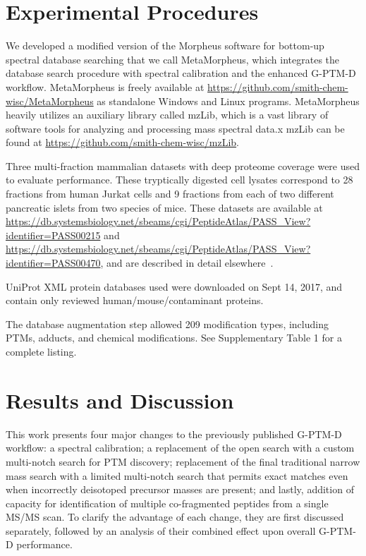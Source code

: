 \documentclass[journal=jprobs,manuscript=article]{achemso}
\begin{document}
\section{Experimental Procedures}

We developed a modified version of the Morpheus software for bottom-up spectral database searching\citep{Wenger_2013} that we call MetaMorpheus, which integrates the database search procedure with spectral calibration and the enhanced G-PTM-D workflow.
MetaMorpheus is freely available at \url{https://github.com/smith-chem-wisc/MetaMorpheus} as standalone Windows and Linux programs.
MetaMorpheus heavily utilizes an auxiliary library called mzLib, which is a vast library of software tools for analyzing and processing mass spectral data.x
mzLib can be found at \url{https://github.com/smith-chem-wisc/mzLib}.

Three multi-fraction mammalian datasets with deep proteome coverage were used to evaluate performance.
These tryptically digested cell lysates correspond to 28 fractions from human Jurkat cells and 9 fractions from each of two different pancreatic islets from two species of mice.
These datasets are available at \url{https://db.systemsbiology.net/sbeams/cgi/PeptideAtlas/PASS_View?identifier=PASS00215} and \url{https://db.systemsbiology.net/sbeams/cgi/PeptideAtlas/PASS_View?identifier=PASS00470}, and are described in detail elsewhere~\citep{Sheynkman2013, Shortreed_2015, Cesnik_2016}.

UniProt XML protein databases used were downloaded on Sept 14, 2017, and contain only reviewed human/mouse/contaminant proteins.

The database augmentation step allowed 209 modification types, including PTMs, adducts, and chemical modifications. See Supplementary Table 1 for a complete listing.

\section{Results and Discussion}

This work presents four major changes to the previously published G-PTM-D workflow:
a spectral calibration;
a replacement of the open search with a custom multi-notch search for PTM discovery;
replacement of the final traditional narrow mass search with a limited multi-notch search that permits exact matches even when incorrectly deisotoped precursor masses are present;
and lastly, addition of capacity for identification of multiple co-fragmented peptides from a single MS/MS scan.
To clarify the advantage of each change, they are first discussed separately, followed by an analysis of their combined effect upon overall G-PTM-D performance.
\end{document}

